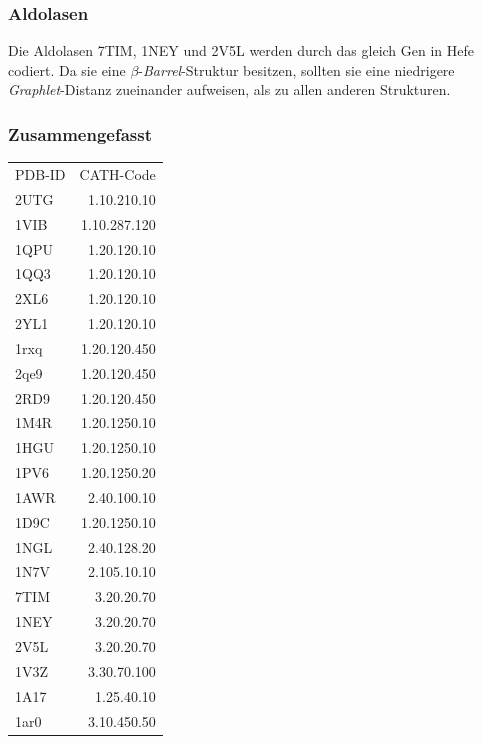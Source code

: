 \documentclass{report}
\begin{document}
\subsubsection{Aldolasen}

Die Aldolasen 7TIM, 1NEY und 2V5L werden durch das gleich Gen in Hefe codiert. Da sie eine $\beta$-\textit{Barrel}-Struktur besitzen, sollten sie eine niedrigere \textit{Graphlet}-Distanz zueinander aufweisen, als zu allen anderen Strukturen.

\subsubsection{Zusammengefasst}

\begin{tabular}{l r}

PDB-ID & CATH-Code  \\
2UTG & 1.10.210.10  \\ %
1VIB & 1.10.287.120 \\ %
1QPU & 1.20.120.10  \\ %
1QQ3 & 1.20.120.10  \\ %
2XL6 & 1.20.120.10  \\ %
2YL1 & 1.20.120.10  \\ %
1rxq & 1.20.120.450 \\ %
2qe9 & 1.20.120.450 \\ %
2RD9 & 1.20.120.450 \\ %
1M4R & 1.20.1250.10 \\ %
1HGU & 1.20.1250.10 \\ %
1PV6 & 1.20.1250.20 \\ %
1AWR & 2.40.100.10  \\ %
1D9C & 1.20.1250.10 \\ %
1NGL & 2.40.128.20  \\ %
1N7V & 2.105.10.10  \\ %
7TIM & 3.20.20.70   \\ %
1NEY & 3.20.20.70   \\ %
2V5L & 3.20.20.70   \\ %
1V3Z & 3.30.70.100  \\ %
1A17 & 1.25.40.10   \\ %
1ar0 & 3.10.450.50  \\ %

\end{tabular}
\end{document}
